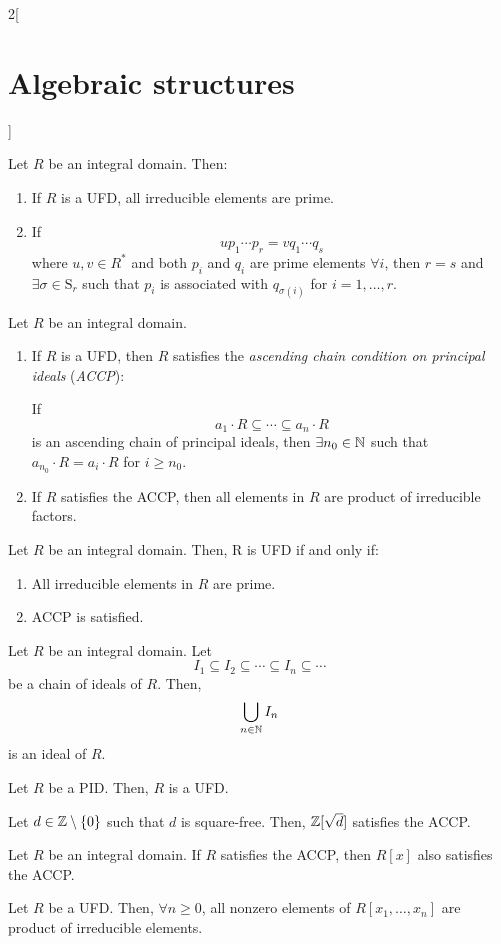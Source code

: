 \documentclass[../../../main_math.tex]{subfiles}
\begin{document}
\begin{multicols}{2}[\section{Algebraic structures}]
  \begin{proposition}
    Let $R$ be an integral domain. Then:
    \begin{enumerate}
      \item If $R$ is a UFD, all irreducible elements are prime.
      \item If $$up_1\cdots p_r=vq_1\cdots q_s$$ where $u,v\in R^*$ and both $p_i$ and $q_i$ are prime elements $\forall i$, then $r=s$ and $\exists\sigma\in \text{S}_r$ such that $p_i$ is associated with $q_{\sigma(i)}$ for $i=1,\ldots,r$.
    \end{enumerate}
  \end{proposition}
  \begin{proposition}
    Let $R$ be an integral domain.
    \begin{enumerate}
      \item If $R$ is a UFD, then $R$ satisfies the \emph{ascending chain condition on principal ideals} (\emph{ACCP}):\par If $$a_1\cdot R\subseteq\cdots\subseteq a_n\cdot R $$ is an ascending chain of principal ideals, then $\exists n_0\in\mathbb{N}$ such that $a_{n_0}\cdot R=a_i\cdot R$ for $i\geq n_0$.
      \item If $R$ satisfies the ACCP, then all elements in $R$ are product of irreducible factors.
    \end{enumerate}
  \end{proposition}
  \begin{theorem}
    Let $R$ be an integral domain. Then, R is UFD if and only if:
    \begin{enumerate}
      \item All irreducible elements in $R$ are prime.
      \item ACCP is satisfied.
    \end{enumerate}
  \end{theorem}
  \begin{lemma}
    Let $R$ be an integral domain. Let $$I_1\subseteq I_2\subseteq\cdots\subseteq I_n\subseteq\cdots$$ be a chain of ideals of $R$. Then, $$\bigcup_{n\in\mathbb{N}}I_n$$ is an ideal of $R$.
  \end{lemma}
  \begin{theorem}
    Let $R$ be a PID. Then, $R$ is a UFD.
  \end{theorem}
  \begin{corollary}
    Let $d\in\mathbb{Z}\setminus\{0\}$ such that $d$ is square-free. Then, $\mathbb{Z}[\sqrt{d}]$ satisfies the ACCP.
  \end{corollary}
  \begin{proposition}
    Let $R$ be an integral domain. If $R$ satisfies the ACCP, then $R[x]$ also satisfies the ACCP.
  \end{proposition}
  \begin{corollary}
    Let $R$ be a UFD. Then, $\forall n\geq 0$, all nonzero elements of $R[x_1,\ldots,x_n]$ are product of irreducible elements.
  \end{corollary}

\end{multicols}
\end{document}
